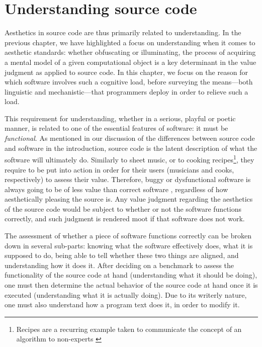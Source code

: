 \chapter{Understanding source code}
\label{chap:understanding}

Aesthetics in source code are thus primarily related to understanding. In the previous chapter, we have highlighted a focus on understanding when it comes to aesthetic standards: whether obfuscating or illuminating, the process of acquiring a mental model of a given computational object is a key determinant in the value judgment as applied to source code. In this chapter, we focus on the reason for which software involves such a cognitive load, before surveying the means—both linguistic and mechanistic—that programmers deploy in order to relieve such a load.

This requirement for understanding, whether in a serious, playful or poetic manner, is related to one of the essential features of software: it must be \emph{functional}. As mentioned in our discussion of the differences between source code and software in the introduction, source code is the latent description of what the software will ultimately do. Similarly to sheet music, or to cooking recipes\footnote{Recipes are a recurring example taken to communicate the concept of an algorithm to non-experts \citep{zeller_algorithms_2020}}, they require to be put into action in order for their users (musicians and cooks, respectively) to assess their value. Therefore, buggy or dysfunctional software is always going to be of less value than correct software \citep{hill_what_2016}, regardless of how aesthetically pleasing the source is. Any value judgment regarding the aesthetics of the source code would be subject to whether or not the software functions correctly, and such judgment is rendered moot if that software does not work.

The assessment of whether a piece of software functions correctly can be broken down in several sub-parts: knowing what the software effectively does, what it is supposed to do, being able to tell whether these two things are aligned, and understanding how it does it. After deciding on a benchmark to assess the functionality of the source code at hand (understanding what it should be doing), one must then determine the actual behavior of the source code at hand once it is executed (understanding what it is actually doing). Due to its writerly nature, one must also understand how a program text does it, in order to modify it.

